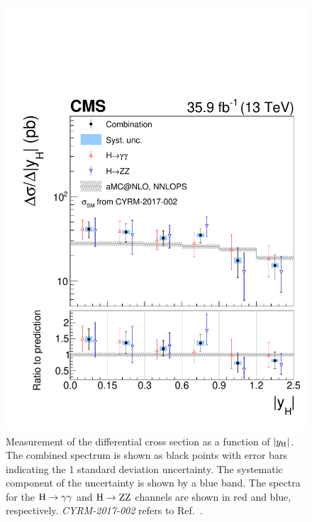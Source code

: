 \begin{figure}[hbtp]
  \begin{center}
    \includegraphics[width=0.49\linewidth]{img/differentials/spectra_rapidity.pdf}
    \caption{
        Measurement of the differential cross section as a function of $\left|y_\mathrm{H}\right| $. The combined spectrum is shown as black points with error bars indicating the 1 standard deviation uncertainty. The systematic component of the uncertainty is shown by a blue band. The spectra for the $\mathrm{H}\to\mathrm{\gamma}\mathrm{\gamma}$ and $\mathrm{H}\to\mathrm{Z}\mathrm{Z}$ channels are shown in red and blue, respectively.
        \textit{CYRM-2017-002} refers to Ref.~\cite{deFlorian:2016spz}.
        }
    \label{fig:CombinedSpectra_rapidity}
  \end{center}
\end{figure}

